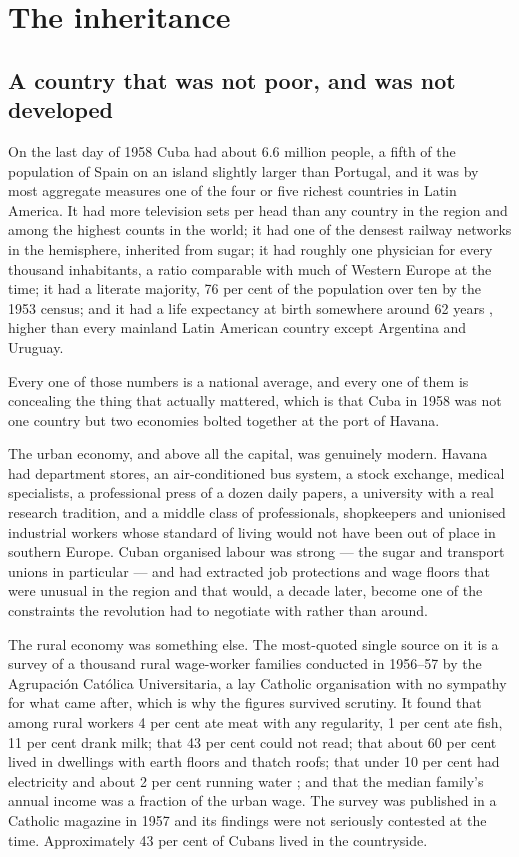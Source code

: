 \chapter{The inheritance}
\label{ch:inheritance}

\section{A country that was not poor, and was not developed}

On the last day of 1958 Cuba had about 6.6 million people, a fifth of the
population of Spain on an island slightly larger than Portugal, and it was by
most aggregate measures one of the four or five richest countries in Latin
America.\unv{} It had more television sets per head than any country in the
region and among the highest counts in the world; it had one of the densest
railway networks in the hemisphere, inherited from sugar; it had roughly one
physician for every thousand inhabitants, a ratio comparable with much of
Western Europe at the time; it had a literate majority, 76 per cent of the
population over ten by the 1953 census; and it had a life expectancy at birth
somewhere around 62 years \citep{perezjr2015}, higher than every mainland Latin American country
except Argentina and Uruguay.\unv{}

Every one of those numbers is a national average, and every one of them is
concealing the thing that actually mattered, which is that Cuba in 1958 was not
one country but two economies bolted together at the port of Havana.

The urban economy, and above all the capital, was genuinely modern. Havana had
department stores, an air-conditioned bus system, a stock exchange, medical
specialists, a professional press of a dozen daily papers, a university with a
real research tradition, and a middle class of professionals, shopkeepers and
unionised industrial workers whose standard of living would not have been out
of place in southern Europe. Cuban organised labour was strong --- the sugar and
transport unions in particular --- and had extracted job protections and wage
floors that were unusual in the region and that would, a decade later, become
one of the constraints the revolution had to negotiate with rather than around.

The rural economy was something else. The most-quoted single source on it is a
survey of a thousand rural wage-worker families conducted in 1956--57 by the
Agrupaci\'on Cat\'olica Universitaria, a lay Catholic organisation with no
sympathy for what came after, which is why the figures survived scrutiny. It
found that among rural workers 4 per cent ate meat with any regularity, 1 per
cent ate fish, 11 per cent drank milk; that 43 per cent could not read; that
about 60 per cent lived in dwellings with earth floors and thatch roofs; that
under 10 per cent had electricity and about 2 per cent running water \citep{perezstable2012}; and that
the median family's annual income was a fraction of the urban wage.\unv{} The
survey was published in a Catholic magazine in 1957 and its findings were not
seriously contested at the time. Approximately 43 per cent of Cubans lived in
the countryside.

